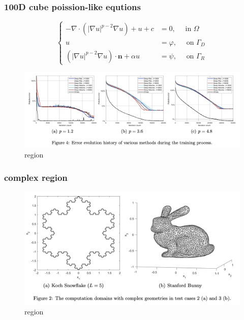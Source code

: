 \documentclass[8pt,aspectratio=15,mathserif]{beamer}
\begin{document}
\begin{frame}
\frametitle{100D cube poission-like equtions}
$$
\left\{\begin{aligned}
-\nabla \cdot\left(|\nabla u|^{p-2} \nabla u\right)+u+c &=0, \quad \text { in } \Omega \\
u &=\varphi, \quad \text { on } \Gamma_{D} \\
\left(|\nabla u|^{p-2} \nabla u\right) \cdot \boldsymbol{n}+\alpha u &=\psi, \quad \text { on } \Gamma_{R}
\end{aligned}\right.
$$
\begin{figure}
\centering
\includegraphics[width=1.0\linewidth]{img/PFNN.png}
\caption{region}
\end{figure}
\end{frame}

\begin{frame}
\frametitle{complex region}
\begin{figure}
\centering
\includegraphics[width=0.8\linewidth]{img/complex_region.png}
\caption{region}
\end{figure}
\end{frame}
\end{document}
